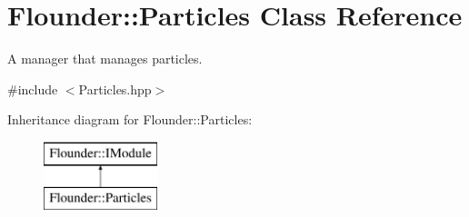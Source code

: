 \hypertarget{class_flounder_1_1_particles}{}\section{Flounder\+:\+:Particles Class Reference}
\label{class_flounder_1_1_particles}


A manager that manages particles.  




{\ttfamily \#include $<$Particles.\+hpp$>$}

Inheritance diagram for Flounder\+:\+:Particles\+:\begin{figure}[H]
\begin{center}
\leavevmode
\includegraphics[height=2.000000cm]{class_flounder_1_1_particles}
\end{center}
\end{figure}
